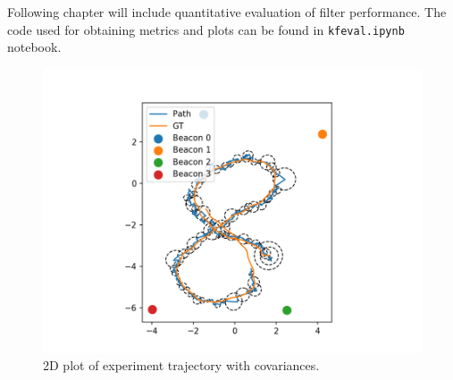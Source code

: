 Following chapter will include quantitative evaluation of filter performance. The code used for obtaining metrics and plots can be found in \verb+kfeval.ipynb+ notebook.

\begin{figure}[H]
    \centering
    \includegraphics[width=\linewidth]{figures/2d_with_cov.png}
    \caption{2D plot of experiment trajectory with covariances.}
    \label{fig:exp_2d_path_covariances}
\end{figure}

